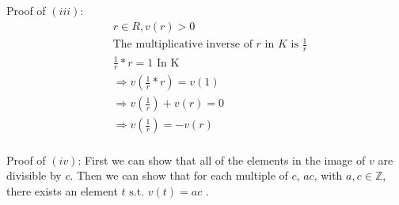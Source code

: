 \documentclass[11pt]{article}
\newcommand{\B}[1]{%
	\mathbb{#1}
}
\newcommand{\st}{
	\text{ s.t. }
}
\begin{document}
{  Proof of $(iii)$:
  \newline
  \begin{align*}
     & r \in R, v(r) > 0                                                \\
     & \text{The multiplicative inverse of $r$ in $K$ is $\frac{1}{r}$} \\
     & \frac{1}{r}*r = 1 \text{ In K}                                   \\
     & \Rightarrow v(\frac{1}{r}*r) = v(1)                              \\
     & \Rightarrow v(\frac{1}{r})+v(r) = 0                              \\
     & \Rightarrow v(\frac{1}{r}) = -v(r)                               \\
  \end{align*}

  Proof of $(iv)$:
  \newline
  First we can show that all of the elements in the image of $v$ are divisible by $c$. Then we can show that for each multiple of $c$, $ac$, with $a, c \in \B{Z}$, there exists an element $t \st v(t) = ac$ .

}
\end{document}
